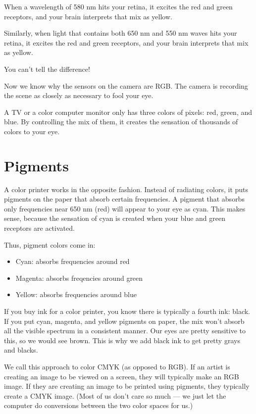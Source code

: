 When a wavelength of 580 nm hits your retina, it excites the red
and green receptors, and your brain interprets that mix as yellow.

Similarly, when light that contains both 650 nm and 550 nm waves hits
your retina, it excites the red and green receptors, and your brain
interprets that mix as yellow.

You can't tell the difference!

Now we know why the sensors on the camera are RGB. The camera is
recording the scene as closely as necessary to fool your eye.

A TV or a color computer monitor only has three colors of pixels: red,
green, and blue.  By controlling the mix of them, it creates the
sensation of thousands of colors to your eye.

\section{Pigments}

A color printer works in the opposite fashion. Instead of radiating
colors, it puts pigments on the paper that absorb certain frequencies.
A pigment that absorbs only frequencies near 650 nm (red) will appear
to your eye as cyan. This makes sense, because the sensation of cyan is
created when your blue and green receptors are activated.

Thus, pigment colors come in:
\begin{itemize}
\item Cyan: absorbs frequencies around red
\item Magenta: absorbs freqencies around green
\item Yellow: absorbs frequencies around blue
\end{itemize}

If you buy ink for a color printer, you know there is typically a
fourth ink: black. If you put cyan, magenta, and yellow pigments on
paper, the mix won't absorb all the visible spectrum in a consistent
manner. Our eyes are pretty sensitive to this, so we would see
brown. This is why we add black ink to get pretty grays and blacks.

We call this approach to color CMYK (as opposed to RGB). If an artist
is creating an image to be viewed on a screen, they will typically
make an RGB image.  If they are creating an image to be printed using
pigments, they typically create a CMYK image. (Most of us don't care
so much --- we just let the computer do conversions between the two
color spaces for us.)

